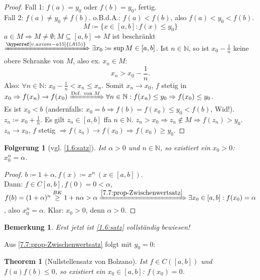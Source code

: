 \documentclass{extreport}
\newcommand{\N}{\mathbb{N}}
\theoremstyle{named}
\newtheorem{namedtheorem}{Theorem} \counterwithin{namedtheorem}{chapter}
\theoremstyle{dotless}
\newtheorem*{bemerkung}{Bemerkung}
\newtheorem*{folgerung*}{Folgerung}
\begin{document}
\begin{proof}
	Fall 1: $f(a) = y_{0}$ oder $f(b) = y_{0}$, fertig. \\
	Fall 2: $f(a) \neq y_{0} \neq f(b)$. o.B.d.A.: $f(a) < f(b)$, also $f(a) < y_{0} < 	f(b)$.
	$$ M \coloneqq \{ x \in [a, b]: f(x) \leq y_{0} \} $$
	$a \in M \Rightarrow M \neq \emptyset; M \subseteq [a, b] \Rightarrow M$ ist beschränkt $\xRightarrow[]{\hyperref[v.axiom-a15]{(A15)}} \exists x_{0} \coloneqq \sup M \in [a, b]$. Ist $n \in \N$, so ist $x_{0} - \frac{1}{n}$ keine obere Schranke von $M$, also ex. $x_{n} \in M$:
		$$ x_{n} > x_{0} - \frac{1}{n}. $$
	Also: $\forall n \in \N$: $x_{0} - \frac{1}{n} < x_{n} \leq x_{n}$. Somit $x_{n} \rightarrow x_{0}$, $f$ stetig in $x_{0} \Rightarrow f(x_{n}) \rightarrow f(x_{0}) \xRightarrow[]{\text{Def. von }M} \forall n \in \N: f(x_{n}) \leq y_{0} \Rightarrow f(x_{0}) \leq y_{0}$. \\
	Es ist $x_{0} < b$ (andernfalls: $x_{0} = b \Rightarrow f(b) = f(x_{0}) \leq y_{0} < f(b)$, Wid!). \\
	$z_{n} \coloneqq x_{0} + \frac{1}{n}$. Es gilt $z_{n} \in [a, b]$ ffa $n \in \N$. $z_{n} > x_{0} \Rightarrow z_{n} \notin M \Rightarrow f(z_{n}) > y_{0}$. $z_{n} \rightarrow x_{0}$, $f$ stetig $\Rightarrow f(z_{n}) \rightarrow f(x_{0}) \Rightarrow f(x_{0}) \geq y_{0}$.
\end{proof}


\begin{folgerung*}[vgl. \ref{1.6:satz}]
	Ist $\alpha > 0$ und $n \in \N$, so existiert ein $x_{0} > 0$: $x_{0}^{n} = \alpha$.	
\end{folgerung*}

\begin{proof}
	$b \coloneqq 1 + \alpha, f(x) \coloneqq x^{n} ~(x \in [a, b])$. \\
	Dann: $f \in C[a, b], f(0) = 0 < \alpha$, $f(b) = (1 + \alpha)^{n} \overset{BK}{\geq} 1 + n \alpha > \alpha \xRightarrow[]{\ref{7.7:prop-Zwischenwertsatz}} \exists x_{0} \in [a, b]: f(x_{0}) = \alpha$, also $x_{0}^{n} = \alpha$. Klar: $x_{0} > 0$, denn $\alpha > 0$.
\end{proof}

\begin{bemerkung}
	Erst jetzt ist \ref{1.6:satz} vollständig bewiesen!
\end{bemerkung}


Aus \ref{7.7:prop-Zwischenwertsatz} folgt mit $y_{0} = 0$:

\begin{namedtheorem}[Nullstellensatz von Bolzano] \label{7.8:prop-NullstellensatzVonBolzano}
	Ist $f \in C\left([a, b]\right)$ und $f(a)f(b) \leq 0$, so existiert ein $x_{0} \in [a, b]$: $f(x_{0}) = 0$.
\end{namedtheorem}
\end{document}
